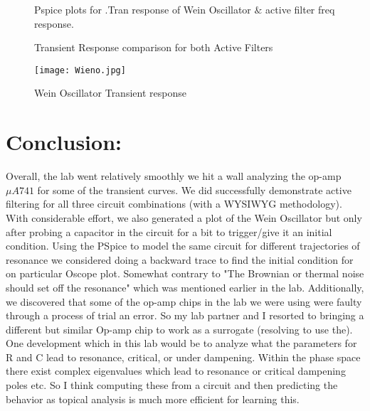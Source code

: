 \documentclass[10pt,a4paper]{article}
\begin{document}
\begin{figure}[!ht]
    \centering
    \qquad
    \caption{Pspice plots for .Tran response of Wein Oscillator $\&$ active filter freq response.}%
    \label{fig:example}%
    
\end{figure}


\begin{figure}[!ht]
    \centering
    \qquad
    \caption{Transient Response comparison for both Active Filters}%
    \label{fig:example}%
\end{figure}
\vspace{5mm}
\begin{figure}[h!]
\begin{center}
  \texttt{[image: Wieno.jpg]}
  \caption{Wein Oscillator Transient response}
\end{center}
\end{figure}

\section*{Conclusion:}
Overall, the lab went relatively smoothly we hit a wall analyzing the op-amp $\mu A741$ for some of the transient curves. We did successfully demonstrate active filtering for all three circuit combinations (with a WYSIWYG methodology). With considerable effort, we also generated a plot of the Wein Oscillator but only after probing a capacitor in the circuit for a bit to trigger/give it an initial condition. Using the PSpice to model the same circuit for different trajectories of resonance we considered doing a backward trace to find the initial condition for on particular Oscope plot. Somewhat contrary to "The Brownian or thermal noise should set off the resonance" which was mentioned earlier in the lab. Additionally, we discovered that some of the op-amp chips in the lab we were using were faulty through a process of trial an error. So my lab partner and I resorted to bringing a different but similar Op-amp chip to work as a surrogate (resolving to use the). One development which in this lab would be to analyze what the parameters for R and C lead to resonance, critical, or under dampening. Within the phase space there exist complex eigenvalues which lead to resonance or critical dampening poles etc. So I think computing these from a circuit and then predicting the behavior as topical analysis is much more efficient for learning this.
\end{document}

